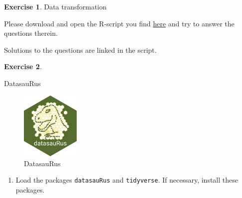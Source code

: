 \documentclass[
  12pt,
  oneside]{book}
\providecommand{\tightlist}{%
  \setlength{\itemsep}{0pt}\setlength{\parskip}{0pt}}
\theoremstyle{definition}
\theoremstyle{definition}
\theoremstyle{definition}
\newtheorem{exercise}{Exercise}[chapter]
\theoremstyle{definition}
\theoremstyle{remark}
\begin{document}
\begin{exercise}
\protect\hypertarget{exr:exer4ds}{}\label{exr:exer4ds}Data transformation

Please download and open the R-script you find \href{https://raw.githubusercontent.com/hubchev/courses/main/scr/data_transformation.R}{here} and try to answer the questions therein.

Solutions to the questions are linked in the script.
\end{exercise}

\begin{exercise}
\protect\hypertarget{exr:DatasauRus}{}\label{exr:DatasauRus}

DatasauRus

\begin{figure}
\centering
\includegraphics[width=0.25\textwidth,height=\textheight]{fig/datasaurus.png}
\caption[\label{fig:label} DatasauRus]{\label{fig:label} DatasauRus\footnotemark{}}
\end{figure}

\begin{enumerate}
\def\labelenumi{\alph{enumi})}
\tightlist
\item
  Load the packages \texttt{datasauRus} and \texttt{tidyverse}. If necessary, install these packages.
\end{enumerate}

\end{exercise}
\end{document}
